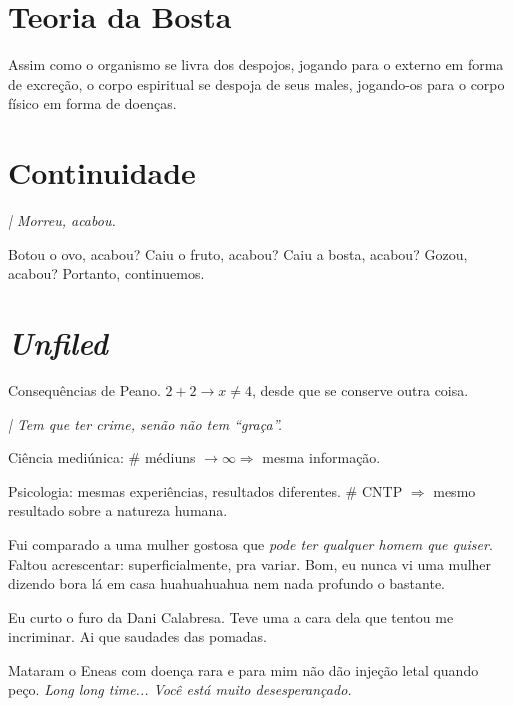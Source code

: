 \documentclass[12pt,a4paper]{article}
\begin{document}
	\section{Teoria da Bosta}
			\begin{flushright}
			\end{flushright}

		Assim como o organismo se livra dos despojos, jogando para o externo em forma de excre\c{c}\~ao, o corpo espiritual se despoja de seus males, jogando-os para o corpo f\'isico\cite{x} em forma de doen\c{c}as.

	\section{Continuidade}
			\begin{flushright}
			\end{flushright}

		\emph{| Morreu, acabou.}

		Botou o ovo, acabou? Caiu o fruto, acabou? Caiu a bosta, acabou? Gozou, acabou? Portanto, continuemos.

  	\section{\emph{Unfiled}}
			\begin{flushright}
			\end{flushright}

			Consequ\^encias de Peano. $2 + 2 \rightarrow x \neq 4$, desde que se conserve outra coisa.

			\emph{| Tem que ter crime, sen\~ao n\~ao tem \textquotedblleft gra\c{c}a\textquotedblright.}

			Ci\^encia medi\'unica: \# m\'ediuns $\rightarrow \infty \Rightarrow$ mesma informa\c{c}\~ao.

			Psicologia: mesmas experi\^encias, resultados diferentes. \# CNTP $\Rightarrow$ mesmo resultado sobre a natureza humana.

			Fui comparado a uma mulher gostosa que \emph{pode\cite{x} ter qualquer homem que quiser}. Faltou acrescentar: superficialmente, pra variar. Bom, eu nunca vi uma mulher dizendo bora l\'a em casa huahuahuahua nem nada profundo o bastante.

			Eu curto o furo da Dani Calabresa. Teve uma a cara dela que tentou me incriminar. Ai que saudades das pomadas.

			Mataram o Eneas com doen\c{c}a rara e para mim n\~ao d\~ao inje\c{c}\~ao letal quando pe\c{c}o. \emph{Long long time... Voc\^e est\'a muito desesperan\c{c}ado.}
\end{document}
